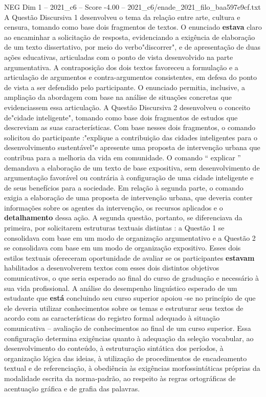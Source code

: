 \begin{textsample}{NEG Dim 1 – 2021\_c6 – Score -4.00 – 2021\_c6/enade\_2021\_filo\_baa597e9cf.txt}
A Questão Discursiva 1 desenvolveu o tema da relação entre arte, cultura e censura, tomando como base dois fragmentos de textos.
O enunciado \textbf{estava} claro ao encaminhar a solicitação de resposta, evidenciando a exigência de elaboração de um texto dissertativo, por meio do verbo"discorrer", e de apresentação de duas ações educativas, articuladas com o ponto de vista desenvolvido na parte argumentativa.
A contraposição dos dois textos favoreceu a formulação e a articulação de argumentos e contra-argumentos consistentes, em defesa do ponto de vista a ser defendido pelo participante.
O enunciado permitia, inclusive, a ampliação da abordagem com base na análise de situações concretas que evidenciassem essa articulação.
A Questão Discursiva 2 desenvolveu o conceito de"cidade inteligente", tomando como base dois fragmentos de estudos que descreviam as suas características.
Com base nesses dois fragmentos, o comando solicitou do participante :"explique a contribuição das cidades inteligentes para o desenvolvimento sustentável"e apresente uma proposta de intervenção urbana que contribua para a melhoria da vida em comunidade.
O comando “ explicar ” demandava a elaboração de um texto de base expositiva, sem desenvolvimento de argumentação favorável ou contrária à configuração de uma cidade inteligente e de seus benefícios para a sociedade.
Em relação à segunda parte, o comando exigia a elaboração de uma proposta de intervenção urbana, que deveria conter informações sobre os agentes da intervenção, os recursos aplicados e o \textbf{detalhamento} dessa ação.
A segunda questão, portanto, se diferenciava da primeira, por solicitarem estruturas textuais distintas : a Questão 1 se consolidava com base em um modo de organização argumentativo e a Questão 2 se consolidava com base em um modo de organização expositivo.
Esses dois estilos textuais ofereceram oportunidade de avaliar se os participantes \textbf{estavam} habilitados a desenvolverem textos com esses dois distintos objetivos comunicativos, o que seria esperado ao final do curso de graduação e necessário à sua vida profissional.
A análise do desempenho linguístico esperado de um estudante que \textbf{está} concluindo seu curso superior apoiou -se no princípio de que ele deveria utilizar conhecimentos sobre os temas e estruturar seus textos de acordo com as características do registro formal adequado à situação comunicativa – avaliação de conhecimentos ao final de um curso superior.
Essa configuração determina exigências quanto à adequação da seleção vocabular, ao desenvolvimento do conteúdo, à estruturação sintática dos períodos, à organização lógica das ideias, à utilização de procedimentos de encadeamento textual e de referenciação, à obediência às exigências morfossintáticas próprias da modalidade escrita da norma-padrão, ao respeito às regras ortográficas de acentuação gráfica e de grafia das palavras.

\end{textsample}
